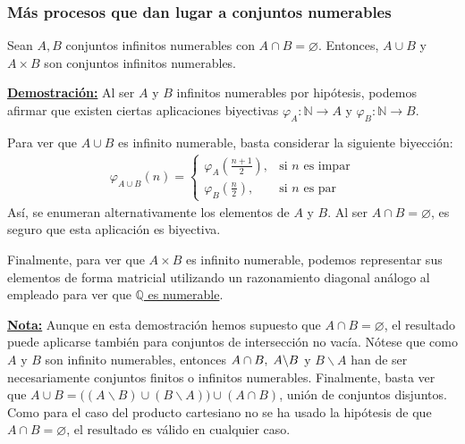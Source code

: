 \documentclass[12pt,a4paper]{article}
\newcommand{\N}{\mathbb{N}}
\newcommand{\Q}{\mathbb{Q}}
\newcounter{unit}[section]
\renewcommand{\theunit}{\arabic{unit}}
\renewcommand{\thesubsubsection}{\theunit.\arabic{subsubsection}}
\newcommand{\dem}{
    \noindent \underline{\textbf{Demostración:}}
}
\newcommand{\nota}{
    \noindent \underline{\textbf{Nota:}}
}
\newcommand{\result}[1]{%
  \subsubsection{#1}%
  \label{subsubsection:\thesubsubsection}%
}
\begin{document}
\result{Más procesos que dan lugar a conjuntos numerables}
\hspace{3mm}
Sean $A, B$ conjuntos infinitos numerables con $A \cap B = \varnothing$.
Entonces, $A \cup B$ y $A \times B$ son conjuntos infinitos numerables.

\vspace{4mm}
\dem Al ser $A$ y $B$ infinitos numerables por hipótesis, podemos afirmar que existen ciertas
aplicaciones biyectivas \hspace{1mm} $\varphi_A : \N \to A$ \hspace{1mm} y \hspace{1mm} $\varphi_B : \N \to B$.

\vspace{2mm} \noindent
Para ver que $A \cup B$ es infinito numerable, basta considerar la siguiente biyección:
\\[-4ex]
\begin{align*}
    \varphi_{A \cup B} (n) =
    \begin{cases}
        \varphi_A\left(\frac{n+1}{2}\right), & \text{si } n \text{ es impar} \\
        \varphi_B\left(\frac{n}{2}\right), & \text{si } n \text{ es par}
    \end{cases}
\end{align*}
Así, se enumeran alternativamente los elementos de $A$ y $B$. Al ser $A \cap B = \varnothing$,
es seguro que esta aplicación es biyectiva.

\vspace{4mm}
Finalmente, para ver que $A \times B$ es infinito numerable, podemos representar sus elementos de forma matricial
utilizando un razonamiento diagonal análogo al empleado para ver que \hyperref[racionales-numerables]{$\Q$ es numerable}.

\vspace{6mm}
\nota Aunque en esta demostración hemos supuesto que $A \cap B = \varnothing$, el resultado puede aplicarse también para conjuntos
de intersección no vacía. Nótese que como $A$ y $B$ son infinito numerables, entonces $A \cap B, \hspace{1mm} A \backslash B$ y $B \backslash A$
han de ser necesariamente conjuntos finitos o infinitos numerables. Finalmente, basta ver que
$A \cup B =\big((A\backslash B) \cup (B \backslash A) \big) \cup (A \cap B)$, unión de conjuntos disjuntos.
Como para el caso del producto cartesiano no se ha usado la hipótesis
de que $A \cap B = \varnothing$, el resultado es válido en cualquier caso.
\end{document}
